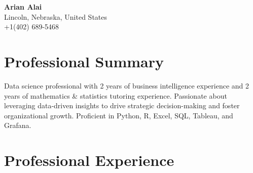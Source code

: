 \documentclass[a4paper,10pt]{article}
\begin{document}
\begin{center}
    {\LARGE \textbf{Arian Alai}} \\
    Lincoln, Nebraska, United States \\
    +1(402) 689-5468 \\

\end{center}

\section*{Professional Summary}
Data science professional with 2 years of business intelligence experience and 2 years of mathematics \& statistics tutoring experience. Passionate about leveraging data-driven insights to drive strategic decision-making and foster organizational growth. Proficient in Python, R, Excel, SQL, Tableau, and Grafana.

\section*{Professional Experience}
\end{document}
